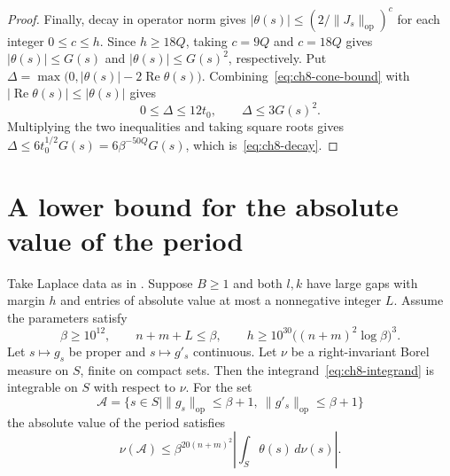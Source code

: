 \begin{proof}
Finally, decay in operator norm gives $|\theta(s)|\le (2/\|J_s\|_{\mathrm{op}})^c$ for each integer $0\le c\le h$. Since $h\ge18Q$, taking $c=9Q$ and $c=18Q$ gives $|\theta(s)|\le G(s)$ and $|\theta(s)|\le G(s)^2$, respectively. Put $\Delta=\max\bigl(0,|\theta(s)|-2\operatorname{Re}\theta(s)\bigr)$. Combining~\eqref{eq:ch8-cone-bound} with $|\operatorname{Re}\theta(s)|\le|\theta(s)|$ gives
\[
 0\le\Delta\le12t_0,\qquad \Delta\le3G(s)^2.
\]
Multiplying the two inequalities and taking square roots gives $\Delta\le6t_0^{1/2}G(s)=6\beta^{-50Q}G(s)$, which is~\eqref{eq:ch8-decay}.
\end{proof}

\section{A lower bound for the absolute value of the period}
\label{sec:ch8-laplace-theorem}

\begin{theorem}
\label{thm:ch8-laplace}
\emitthmsource
Take Laplace data as in . Suppose $B\ge1$ and both $l,k$ have large gaps with margin $h$ and entries of absolute value at most a nonnegative integer $L$. Assume the parameters satisfy
\[
 \beta\ge10^{12},\qquad n+m+L\le\beta,\qquad
 h\ge10^{30}\bigl((n+m)^2\log\beta\bigr)^3.
\]
Let $s\mapsto g_s$ be proper and $s\mapsto g'_s$ continuous. Let $\nu$ be a right-invariant Borel measure on $S$, finite on compact sets. Then the integrand~\eqref{eq:ch8-integrand} is integrable on $S$ with respect to $\nu$. For the set
\[
 \mathcal A=\bigl\{s\in S\mid \|g_s\|_{\mathrm{op}}\le\beta+1,\
                           \|g'_s\|_{\mathrm{op}}\le\beta+1\bigr\}
\]
the absolute value of the period satisfies
\begin{equation}
\label{eq:ch8-laplace-lower}
  \nu(\mathcal A)\le
  \beta^{20(n+m)^2}\left|\int_S\theta(s)\,d\nu(s)\right|.
\end{equation}
\end{theorem}

